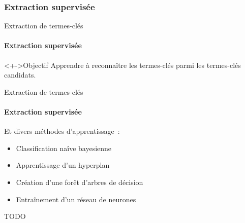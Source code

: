 \subsubsection{Extraction supervisée}
  \begin{frame}{Extraction de termes-clés}\framesubtitle{Extraction supervisée}
    \begin{block}<+->{Objectif}
      Apprendre à reconnaître les termes-clés parmi les termes-clés candidats.
    \end{block}

    \vspace{1em}

  \end{frame}

  \begin{frame}[t]{Extraction de termes-clés}\framesubtitle{Extraction supervisée}
    Et divers méthodes d'apprentissage~:
    \begin{itemize}
      \item{Classification naîve bayesienne}
      \item<3->{Apprentissage d'un hyperplan}
      \item<5->{Création d'une forêt d'arbres de décision}
      \item<7->{Entraînement d'un réseau de neurones}
    \end{itemize}

    \begin{center}
      \vfill{}

      TODO

      \vfill{}

    \end{center}
  \end{frame}

